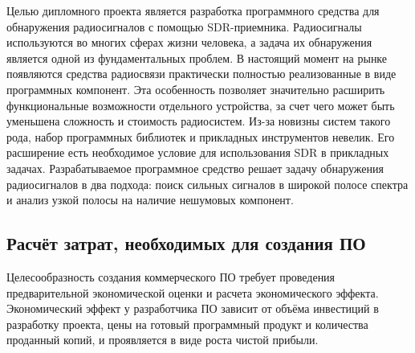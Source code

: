 Целью дипломного проекта является разработка программного средства для обнаружения радиосигналов с помощью SDR-приемника.
Радиосигналы используются во многих сферах жизни человека, а задача их обнаружения является одной из фундаментальных проблем.
В настоящий момент на рынке появляются средства радиосвязи практически полностью реализованные в виде программных компонент. Эта особенность позволяет значительно расширить функциональные возможности отдельного устройства, за счет чего может быть уменьшена сложность и стоимость радиосистем.
Из-за новизны систем такого рода, набор программных библиотек и прикладных инструментов невелик. Его расширение есть необходимое условие для использования SDR в прикладных задачах.
Разрабатываемое программное средство решает задачу обнаружения радиосигналов в два подхода: поиск сильных сигналов в широкой полосе спектра и анализ узкой полосы на наличие нешумовых компонент.

\subsection{Расчёт затрат, необходимых для создания ПО}

Целесообразность создания коммерческого ПО требует проведения предварительной экономической оценки и расчета экономического эффекта.
Экономический эффект у разработчика ПО зависит от объёма инвестиций в разработку проекта, цены на готовый программный продукт и количества проданный копий, и проявляется в виде роста чистой прибыли.   

